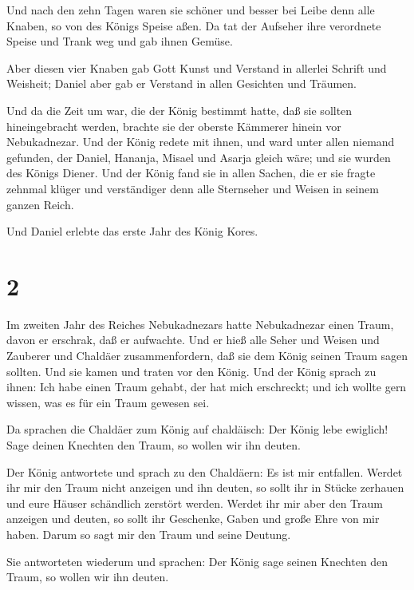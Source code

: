  Und nach den zehn Tagen waren sie schöner und besser bei
Leibe denn alle Knaben, so von des Königs Speise aßen.  Da
tat der Aufseher ihre verordnete Speise und Trank weg und gab ihnen
Gemüse.

 Aber diesen vier Knaben gab Gott Kunst und Verstand in
allerlei Schrift und Weisheit; Daniel aber gab er Verstand in allen
Gesichten und Träumen.

 Und da die Zeit um war, die der König bestimmt hatte, daß
sie sollten hineingebracht werden, brachte sie der oberste Kämmerer
hinein vor Nebukadnezar.  Und der König redete mit ihnen,
und ward unter allen niemand gefunden, der Daniel, Hananja, Misael und
Asarja gleich wäre; und sie wurden des Königs Diener.  Und
der König fand sie in allen Sachen, die er sie fragte zehnmal klüger und
verständiger denn alle Sternseher und Weisen in seinem ganzen Reich.

 Und Daniel erlebte das erste Jahr des König Kores.

\hypertarget{section-1}{%
\section{2}\label{section-1}}

 Im zweiten Jahr des Reiches Nebukadnezars hatte
Nebukadnezar einen Traum, davon er erschrak, daß er aufwachte.
 Und er hieß alle Seher und Weisen und Zauberer und Chaldäer
zusammenfordern, daß sie dem König seinen Traum sagen sollten. Und sie
kamen und traten vor den König.  Und der König sprach zu
ihnen: Ich habe einen Traum gehabt, der hat mich erschreckt; und ich
wollte gern wissen, was es für ein Traum gewesen sei.

 Da sprachen die Chaldäer zum König auf chaldäisch: Der
König lebe ewiglich! Sage deinen Knechten den Traum, so wollen wir ihn
deuten.

 Der König antwortete und sprach zu den Chaldäern: Es ist
mir entfallen. Werdet ihr mir den Traum nicht anzeigen und ihn deuten,
so sollt ihr in Stücke zerhauen und eure Häuser schändlich zerstört
werden.  Werdet ihr mir aber den Traum anzeigen und deuten,
so sollt ihr Geschenke, Gaben und große Ehre von mir haben. Darum so
sagt mir den Traum und seine Deutung.

 Sie antworteten wiederum und sprachen: Der König sage
seinen Knechten den Traum, so wollen wir ihn deuten.

